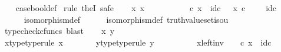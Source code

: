 \begin{isabellebody}
%
\isadelimproof
\ \ %
\endisadelimproof
%
\isatagproof
{}\isamarkupfalse%
\ case{\isacharunderscore}{\kern0pt}bool{\isacharunderscore}{\kern0pt}def\isanewline
{}\isamarkupfalse%
\ {\isacharparenleft}{\kern0pt}rule\ theI{\isacharprime}{\kern0pt}{\isacharcomma}{\kern0pt}\ safe{\isacharparenright}{\kern0pt}\isanewline
\ \ \isamarkupfalse%
\ {\isachardoublequoteopen}{\isasymexists}x{\isachardot}{\kern0pt}\ x\ {\isacharcolon}{\kern0pt}\ {\isasymOmega}\ {\isasymrightarrow}\ {\isasymone}\ {\isasymCoprod}\ {\isasymone}\ {\isasymand}\ {\isasymt}\ {\isasymamalg}\ {\isasymf}\ {\isasymcirc}\isactrlsub c\ x\ {\isacharequal}{\kern0pt}\ id\isactrlsub c\ {\isasymOmega}\ {\isasymand}\ x\ {\isasymcirc}\isactrlsub c\ {\isasymt}\ {\isasymamalg}\ {\isasymf}\ {\isacharequal}{\kern0pt}\ id\isactrlsub c\ {\isacharparenleft}{\kern0pt}{\isasymone}\ {\isasymCoprod}\ {\isasymone}{\isacharparenright}{\kern0pt}{\isachardoublequoteclose}\isanewline
\ \ \ \ \isamarkupfalse%
\ isomorphism{\isacharunderscore}{\kern0pt}def\isanewline
\ \ \ \ \isamarkupfalse%
\ isomorphism{\isacharunderscore}{\kern0pt}def{}\ truth{\isacharunderscore}{\kern0pt}value{\isacharunderscore}{\kern0pt}set{\isacharunderscore}{\kern0pt}iso{\isacharunderscore}{\kern0pt}{}u{}\ \isamarkupfalse%
\ {\isacharparenleft}{\kern0pt}typecheck{\isacharunderscore}{\kern0pt}cfuncs{\isacharcomma}{\kern0pt}\ blast{\isacharparenright}{\kern0pt}\isanewline
{}\isamarkupfalse%
\isanewline
\ \ \isamarkupfalse%
\ x\ y\isanewline
\ \ \isamarkupfalse%
\ x{\isacharunderscore}{\kern0pt}type{\isacharbrackleft}{\kern0pt}type{\isacharunderscore}{\kern0pt}rule{\isacharbrackright}{\kern0pt}{\isacharcolon}{\kern0pt}\ {\isachardoublequoteopen}x\ {\isacharcolon}{\kern0pt}\ {\isasymOmega}\ {\isasymrightarrow}\ {\isasymone}\ {\isasymCoprod}\ {\isasymone}{\isachardoublequoteclose}\ \ y{\isacharunderscore}{\kern0pt}type{\isacharbrackleft}{\kern0pt}type{\isacharunderscore}{\kern0pt}rule{\isacharbrackright}{\kern0pt}{\isacharcolon}{\kern0pt}\ {\isachardoublequoteopen}y\ {\isacharcolon}{\kern0pt}\ {\isasymOmega}\ {\isasymrightarrow}\ {\isasymone}\ {\isasymCoprod}\ {\isasymone}{\isachardoublequoteclose}\isanewline
\ \ \isamarkupfalse%
\ x{\isacharunderscore}{\kern0pt}left{\isacharunderscore}{\kern0pt}inv{\isacharcolon}{\kern0pt}\ {\isachardoublequoteopen}{\isasymt}\ {\isasymamalg}\ {\isasymf}\ {\isasymcirc}\isactrlsub c\ x\ {\isacharequal}{\kern0pt}\ id\isactrlsub c\ {\isasymOmega}{\isachardoublequoteclose}\isanewline

\end{isabellebody}
